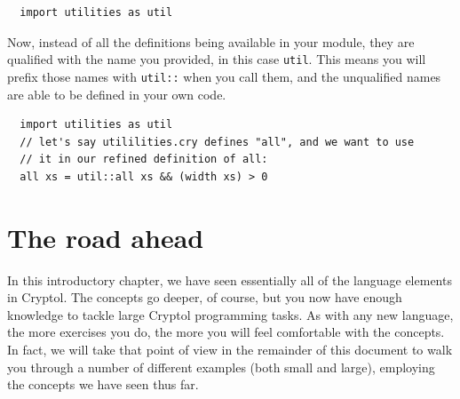 \begin{verbatim}
  import utilities as util
\end{verbatim}

Now, instead of all the definitions being available in your module,
they are qualified with the name you provided, in this case \verb+util+.
This means you will prefix those names with \verb+util::+ when you call them,
and the unqualified names are able to be defined in your own code.

\begin{verbatim}
  import utilities as util
  // let's say utililities.cry defines "all", and we want to use
  // it in our refined definition of all:
  all xs = util::all xs && (width xs) > 0
\end{verbatim}

\section{The road ahead}
\label{sec:road-ahead}

In this introductory chapter, we have seen essentially all of the
language elements in Cryptol. The concepts go deeper, of course, but
you now have enough knowledge to tackle large Cryptol programming
tasks. As with any new language, the more exercises you do, the more
you will feel comfortable with the concepts. In fact, we will take
that point of view in the remainder of this document to walk you
through a number of different examples (both small and large),
employing the concepts we have seen thus far.

